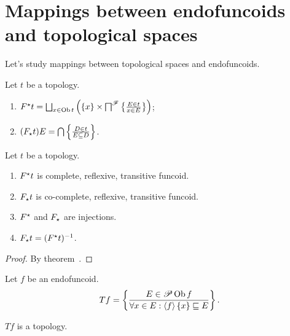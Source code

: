 \chapter{Mappings between endofuncoids and topological spaces}

Let's study mappings between topological spaces and endofuncoids.

\begin{defn}
  Let $t$ be a topology.
  \begin{enumerate}
    \item $F^{\fullstar} t = \bigsqcup_{x \in \Ob t} \left( \{ x \} \times
    \bigsqcap^{\mathscr{F}} \setcond{ E \in t }{ x \in
    E } \right)$;
    
    \item $(F_{\star} t) E = \bigcap \left\{ \frac{ D \in t }{ E \subseteq D }\right\}$.
  \end{enumerate}
\end{defn}

\begin{prop}
  Let $t$ be a topology.
  \begin{enumerate}
    \item $F^{\star} t$ is complete, reflexive, transitive funcoid.
    
    \item $F_{\star} t$ is co-complete, reflexive, transitive funcoid.
    
    \item $F^{\star}$ and $F_{\star}$ are injections.
    
    \item $F_{\star} t = (F^{\star} t)^{- 1}$.
  \end{enumerate}
\end{prop}

\begin{proof}
  By theorem~.
\end{proof}

\begin{defn}
  Let $f$ be an endofuncoid.
  \[ T f = \left\{ \frac{ E \in \mathscr{P} \operatorname{Ob} f }{
     \forall x \in E : \left\langle f\right\rangle \{ x \} \sqsubseteq E }\right\} . \]
\end{defn}

\begin{prop}
  $T f$ is a topology.
\end{prop}

